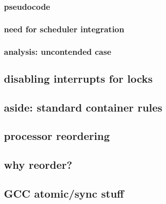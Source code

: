

\subsubsection{pseudocode}


\subsubsection{need for scheduler integration}


\subsubsection{analysis: uncontended case}



\subsection{disabling interrupts for locks}


%

\subsection{aside: standard container rules}


\subsection{processor reordering}


\subsection{why reorder?}



\subsection{GCC atomic/sync stuff}


